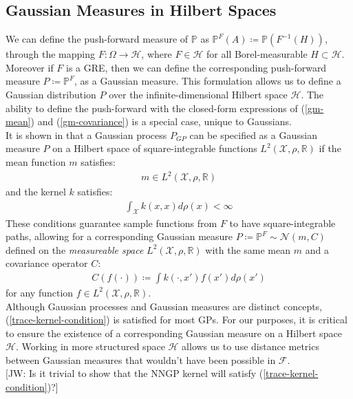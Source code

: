 \documentclass[twoside,11pt]{article}
\newcommand{\jw}[1]{{\color{gray} [JW: #1]}}
\begin{document}
\subsection{Gaussian Measures in Hilbert Spaces \cite{wild2022generalized}}
We can define the push-forward measure of $\mathbb{P}$ as $\mathbb{P}^{F}(A) \coloneqq \mathbb{P}(F^{-1}(H))$, through the mapping $F: \Omega \rightarrow \mathcal{H}$, where $F \in \mathcal{H}$ for all Borel-measurable $H \subset \mathcal{H}$. Moreover if $F$ is a GRE, then we can define the corresponding push-forward measure $P \coloneqq \mathbb{P}^{F}$, as a Gaussian measure. This formulation allows us to define a Gaussian distribution $P$ over the infinite-dimensional Hilbert space $\mathcal{H}$. The ability to define the push-forward with the closed-form expressions of (\ref{gm-mean}) and (\ref{gm-covariance}) is a special case, unique to Gaussians.
\newline
\\It is shown in \cite{wild2022generalized} that a Gaussian process $P_{GP}$ can be specified as a Gaussian measure $P$ on a Hilbert space of square-integrable functions $L^2(\mathcal{X}, \rho, \mathbb{R})$ if the mean function $m$ satisfies:
\begin{align}
    \label{smooth-mean-function-condition}
    m \in L^2(\mathcal{X}, \rho, \mathbb{R})
\end{align}
and the kernel $k$ satisfies:
\begin{align}
    \int_{\mathcal{X}} k(x, x) d\rho(x) < \infty
    \label{trace-kernel-condition}
\end{align}
These conditions guarantee sample functions from $F$ to have square-integrable paths, allowing for a corresponding Gaussian measure $P \coloneqq \mathbb{P}^F \sim \mathcal{N}(m, C)$ defined on the \textit{measureable space} $L^2(\mathcal{X}, \rho, \mathbb{R})$ with the same mean $m$ and a covariance operator $C$:
\begin{align}
    C(f(\cdot)) \coloneqq \int k(\cdot, x')f(x')d \rho(x')
    \label{gm-covariance-operator}
\end{align}
for any function $f \in L^2(\mathcal{X}, \rho, \mathbb{R})$. \\
\newline 
Although Gaussian processes and Gaussian measures are distinct concepts, (\ref{trace-kernel-condition}) is satisfied for most GPs. For our purposes, it is critical to ensure the existence of a corresponding Gaussian measure on a Hilbert space $\mathcal{H}$. Working in more structured space $\mathcal{H}$ allows us to use distance metrics between Gaussian measures that wouldn't have been possible in $\mathcal{F}$.
\\\jw{Is it trivial to show that the NNGP kernel will satisfy (\ref{trace-kernel-condition})?}
\end{document}
